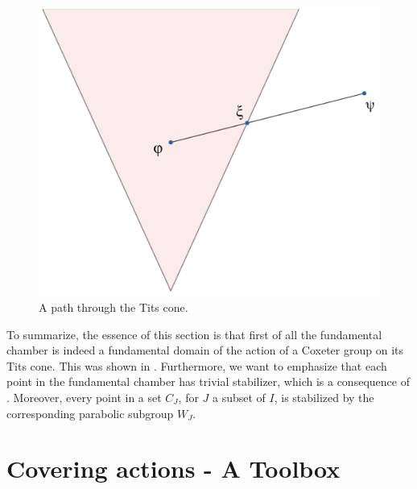 \begin{figure}[h]
    \centering
    \includegraphics{gfx/pfad durch kegel.png}
    \caption{A path through the Tits cone.}
    \label{img:path}
\end{figure}

To summarize, the essence of this section is that first of all the fundamental chamber is indeed a fundamental domain of the action of a Coxeter group on its Tits cone.
This was shown in .
Furthermore, we want to emphasize that each point in the fundamental chamber has trivial stabilizer, which is a consequence of .
Moreover, every point in a set \(C_J\), for \(J\) a subset of \(I\), is stabilized by the corresponding parabolic subgroup \(W_J\).



\section{Covering actions - A Toolbox}

